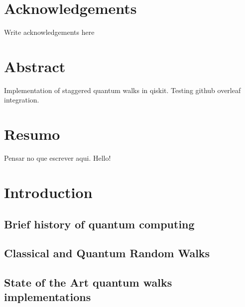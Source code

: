 \documentclass[
oneside,
11pt, a4paper,
footinclude=true,
headinclude=true,
cleardoublepage=empty
]{scrbook}
\author{Jaime Santos}
\date{\myear} %
\begin{document}
\umfrontcover	
\umtitlepage

\chapter*{Acknowledgements}
Write acknowledgements here


\chapter*{Abstract}
Implementation of staggered quantum walks in qiskit.
Testing github overleaf integration.

\cleardoublepage
\chapter*{Resumo}
Pensar no que escrever aqui.
Hello!	

\tableofcontents
\listoffigures
\listoftables



\chapter{Introduction}
\section{Brief history of quantum computing}

\section{Classical and Quantum Random Walks}

\section{State of the Art quantum walks implementations}

\end{document}
